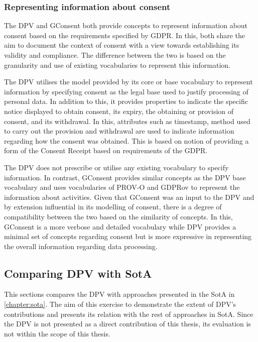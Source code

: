 \subsubsection{Representing information about consent}
The DPV and GConsent both provide concepts to represent information about consent based on the requirements specified by GDPR.
In this, both share the aim to document the context of consent with a view towards establishing its validity and compliance.
The difference between the two is based on the granularity and use of existing vocabularies to represent this information.

The DPV utilises the model provided by its core or base vocabulary to represent information by specifying consent as the legal base used to justify processing of personal data.
In addition to this, it provides properties to indicate the specific notice displayed to obtain consent, its expiry, the obtaining or provision of consent, and its withdrawal.
In this, attributes such as timestamp, method used to carry out the provision and withdrawal are used to indicate information regarding how the consent was obtained.
This is based on notion of providing a form of the Consent Receipt based on requirements of the GDPR.

The DPV does not prescribe or utilise any existing vocabulary to specify information.
In contrast, GConsent provides similar concepts as the DPV base vocabulary and uses vocabularies of PROV-O and GDPRov to represent the information about activities.
Given that GConsent was an input to the DPV and by extension influential in its modelling of consent, there is a degree of compatibility between the two based on the similarity of concepts.
In this, GConsent is a more verbose and detailed vocabulary while DPV provides a minimal set of concepts regarding consent but is more expressive in representing the overall information regarding data processing.

\subsection{Comparing DPV with SotA}\label{sec:voc:dpv-sota}
This sections compares the DPV with approaches presented in the SotA in \autoref{chapter:sota}.
The aim of this exercise to demonstrate the extent of DPV's contributions and presents its relation with the rest of approaches in SotA.
Since the DPV is not presented as a direct contribution of this thesis, its evaluation is not within the scope of this thesis.

